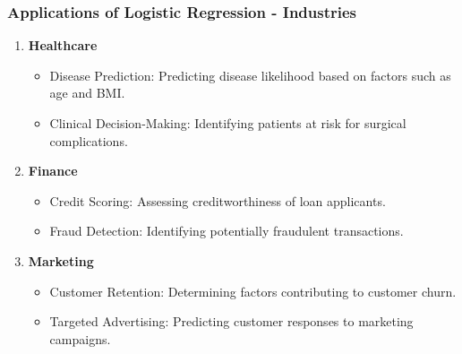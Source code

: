 \documentclass[aspectratio=169]{beamer}
\begin{document}
\begin{frame}[fragile]
    \frametitle{Applications of Logistic Regression - Industries}
    \begin{enumerate}
        \item \textbf{Healthcare}
            \begin{itemize}
                \item Disease Prediction: Predicting disease likelihood based on factors such as age and BMI.
                \item Clinical Decision-Making: Identifying patients at risk for surgical complications.
            \end{itemize}
        
        \item \textbf{Finance}
            \begin{itemize}
                \item Credit Scoring: Assessing creditworthiness of loan applicants.
                \item Fraud Detection: Identifying potentially fraudulent transactions.
            \end{itemize}
        
        \item \textbf{Marketing}
            \begin{itemize}
                \item Customer Retention: Determining factors contributing to customer churn.
                \item Targeted Advertising: Predicting customer responses to marketing campaigns.
            \end{itemize}
    \end{enumerate}
\end{frame}
\end{document}
